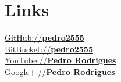 \documentclass[letterpaper]{deedy-resume} %
\begin{document}
\begin{minipage}[t]{0.33\textwidth}
\section{Links}
\href{https://github.com/pedro2555}{GitHub://\textbf{pedro2555}}\\
\href{https://bitbucket.org/pedro2555}{BitBucket://\textbf{pedro2555}}\\
\href{https://www.youtube.com/channel/UCxvDHtW_fPVIPHXOBzxt6Fg}{YouTube://\textbf{Pedro Rodrigues}}\\
\href{https://plus.google.com/105867523802923906663/posts}{Google+://\textbf{Pedro Rodrigues}}\\

\end{minipage}
\hfill
%
%
\end{document}
